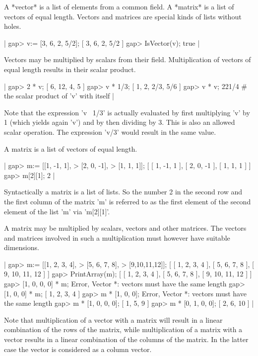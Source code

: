 
A *vector* is a list  of  elements  from a common field.  A *matrix* is a
list of vectors of  equal length.  Vectors and matrices are special kinds
of lists without holes.

|    gap> v:= [3, 6, 2, 5/2];
    [ 3, 6, 2, 5/2 ]
    gap> IsVector(v);
    true |

Vectors may be multiplied by scalars from their field.  Multiplication of
vectors of equal length results in their scalar product.

|    gap> 2 * v;
    [ 6, 12, 4, 5 ]
    gap> v * 1/3;
    [ 1, 2, 2/3, 5/6 ]
    gap> v * v;
    221/4  # the scalar product of 'v' with itself |

Note  that  the expression 'v  \*\ 1/3'  is  actually evaluated  by first
multiplying 'v' by 1 (which yields again 'v') and by then dividing by  3.
This is  also an allowed  scalar  operation.   The expression 'v/3' would
result in the same value.

A matrix is a list of vectors of equal length.

|    gap> m:= [[1, -1, 1],
    >         [2, 0, -1],
    >         [1, 1, 1]];
    [ [ 1, -1, 1 ], [ 2, 0, -1 ], [ 1, 1, 1 ] ]
    gap> m[2][1];
    2 |

Syntactically a matrix is a list of lists.  So the number 2 in the second
row and  the first  column of the matrix 'm' is referred to as  the first
element of the second element of the list 'm' via 'm[2][1]'.

A matrix may be multiplied by  scalars, vectors  and other matrices.  The
vectors and  matrices involved in such a multiplication must however have
suitable dimensions.

|    gap> m:= [[1, 2, 3, 4],
    >         [5, 6, 7, 8],
    >         [9,10,11,12]];
    [ [ 1, 2, 3, 4 ], [ 5, 6, 7, 8 ], [ 9, 10, 11, 12 ] ]
    gap> PrintArray(m);
    [ [   1,   2,   3,   4 ],
      [   5,   6,   7,   8 ],
      [   9,  10,  11,  12 ] ]
    gap> [1, 0, 0, 0] * m;
    Error, Vector *: vectors must have the same length
    gap> [1, 0, 0] * m;
    [ 1, 2, 3, 4 ]
    gap> m * [1, 0, 0];
    Error, Vector *: vectors must have the same length
    gap> m * [1, 0, 0, 0];
    [ 1, 5, 9 ]
    gap> m * [0, 1, 0, 0];
    [ 2, 6, 10 ] |

Note that  multiplication  of a  vector  with a  matrix  will result in a
linear combination of  the rows of the matrix, while multiplication  of a
matrix with a  vector results in a linear  combination of  the columns of
the  matrix.  In the  latter  case  the vector is considered  as a column
vector.

